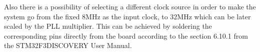 \documentclass[12pt]{report}%
\begin{document}
Also there is a possibility of selecting a different clock source in order to make the system go from the fixed 8MHz as the input clock, to 32MHz which can be later scaled by the PLL multiplier. This can be achieved by soldering the corresponding pins directly from the board according to the section 6.10.1 from the STM32F3DISCOVERY User Manual\cite{mcu}.
\fi

\printbibliography
\nocite{*}
\end{document}
